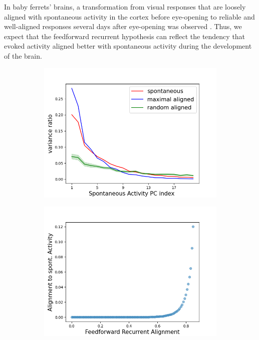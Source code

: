 \documentclass[11pt]{article}
\begin{document}
	In baby ferrets' brains, a transformation from visual responses that are loosely aligned with spontaneous activity in the cortex before eye-opening to reliable and well-aligned responses several days after eye-opening was observed \cite{tragenap2023nature}. Thus, we expect that the feedforward recurrent hypothesis can reflect the tendency that evoked activity aligned better with spontaneous activity during the development of the brain. 
	\vspace{-0.4cm}
		\begin{figure}[H] 
			\centering
			\begin{subfigure}[b]{0.45\textwidth} 
				\includegraphics[width=\textwidth]{../figures/align_to_spont_act_variance_ratio.png}
				\caption{}
				\label{fig:variance_ratio_sym}
			\end{subfigure}
			\begin{subfigure}[b]{0.45\textwidth}
				\includegraphics[width=\textwidth]{../figures/spont_align_ffrec_sym.png}

\end{subfigure}
\end{figure}
\end{document}
